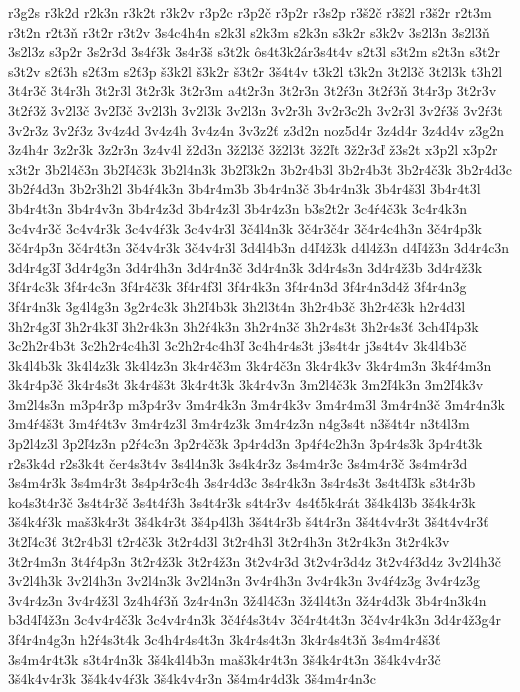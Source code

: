 {r3g2s
r3k2d
r2k3n
r3k2t
r3k2v
r3p2c
r3p2č
r3p2r
r3s2p
r3š2č
r3š2l
r3š2r
r2t3m
r3t2n
r2t3ň
r3t2r
r3t2v
3s4c4h4n
s2k3l
s2k3m
s2k3n
s3k2r
s3k2v
3s2l3n
3s2l3ň
3s2l3z
s3p2r
3s2r3d
3s4ŕ3k
3s4r3š
s3t2k
ôs4t3k2ár3s4t4v
s2t3l
s3t2m
s2t3n
s3t2r
s3t2v
s2ť3h
s2ť3m
s2ť3p
š3k2l
š3k2r
š3t2r
3š4t4v
t3k2l
t3k2n
3t2l3č
3t2l3k
t3h2l
3t4r3č
3t4r3h
3t2r3l
3t2r3k
3t2r3m
a4t2r3n
3t2r3n
3t2ŕ3n
3t2ŕ3ň
3t4r3p
3t2r3v
3t2ŕ3ž
3v2l3č
3v2ľ3č
3v2l3h
3v2l3k
3v2l3n
3v2r3h
3v2r3c2h
3v2r3l
3v2ŕ3š
3v2ŕ3t
3v2r3z
3v2ŕ3z
3v4z4d
3v4z4h
3v4z4n
3v3z2ť
z3d2n
noz5d4r
3z4d4r
3z4d4v
z3g2n
3z4h4r
3z2r3k
3z2r3n
3z4v4l
ž2d3n
3ž2l3č
3ž2l3t
3ž2ľt
3ž2r3ď
ž3s2t
x3p2l
x3p2r
x3t2r
3b2l4č3n
3b2ľ4č3k
3b2l4n3k
3b2ľ3k2n
3b2r4b3l
3b2r4b3t
3b2r4č3k
3b2r4d3c
3b2ŕ4d3n
3b2r3h2l
3b4ŕ4k3n
3b4r4m3b
3b4r4n3č
3b4r4n3k
3b4r4š3l
3b4r4t3l
3b4r4t3n
3b4r4v3n
3b4r4z3d
3b4r4z3l
3b4r4z3n
b3s2t2r
3c4ŕ4č3k
3c4r4k3n
3c4v4r3č
3c4v4r3k
3c4v4ŕ3k
3c4v4r3l
3č4l4n3k
3č4r3č4r
3č4r4c4h3n
3č4r4p3k
3č4r4p3n
3č4r4t3n
3č4v4r3k
3č4v4r3l
3d4l4b3n
d4ľ4ž3k
d4l4ž3n
d4ľ4ž3n
3d4r4c3n
3d4r4g3ľ
3d4r4g3n
3d4r4h3n
3d4r4n3č
3d4r4n3k
3d4r4s3n
3d4r4ž3b
3d4r4ž3k
3f4r4c3k
3f4r4c3n
3f4r4č3k
3f4r4f3l
3f4r4k3n
3f4r4n3d
3f4r4n3d4ž
3f4r4n3g
3f4r4n3k
3g4l4g3n
3g2r4c3k
3h2ľ4b3k
3h2l3t4n
3h2r4b3č
3h2r4č3k
h2r4d3l
3h2r4g3ľ
3h2r4k3ľ
3h2r4k3n
3h2ŕ4k3n
3h2r4n3č
3h2r4s3t
3h2r4s3ť
3ch4ľ4p3k
3c2h2r4b3t
3c2h2r4c4h3l
3c2h2r4c4h3ľ
3c4h4r4s3t
j3s4t4r
j3s4t4v
3k4l4b3č
3k4l4b3k
3k4l4z3k
3k4l4z3n
3k4r4č3m
3k4r4č3n
3k4r4k3v
3k4r4m3n
3k4ŕ4m3n
3k4r4p3č
3k4r4s3t
3k4r4š3t
3k4r4t3k
3k4r4v3n
3m2l4č3k
3m2ľ4k3n
3m2ľ4k3v
3m2l4s3n
m3p4r3p
m3p4r3v
3m4r4k3n
3m4r4k3v
3m4r4m3l
3m4r4n3č
3m4r4n3k
3m4ŕ4š3t
3m4ŕ4t3v
3m4r4z3l
3m4r4z3k
3m4r4z3n
n4g3s4t
n3š4t4r
n3t4l3m
3p2l4z3l
3p2ľ4z3n
p2ŕ4c3n
3p2r4č3k
3p4r4d3n
3p4ŕ4c2h3n
3p4r4s3k
3p4r4t3k
r2s3k4d
r2s3k4t
čer4s3t4v
3s4l4n3k
3s4k4r3z
3s4m4r3c
3s4m4r3č
3s4m4r3d
3s4m4r3k
3s4m4r3t
3s4p4r3c4h
3s4r4d3c
3s4r4k3n
3s4r4s3t
3s4t4ľ3k
s3t4r3b
ko4s3t4r3č
3s4t4r3č
3s4t4ŕ3h
3s4t4r3k
s4t4r3v
4s4ť5k4rát
3š4k4l3b
3š4k4r3k
3š4k4ŕ3k
maš3k4r3t
3š4k4r3t
3š4p4l3h
3š4t4r3b
š4t4r3n
3š4t4v4r3t
3š4t4v4r3ť
3t2ľ4c3ť
3t2r4b3l
t2r4č3k
3t2r4d3l
3t2r4h3l
3t2r4h3n
3t2r4k3n
3t2r4k3v
3t2r4m3n
3t4ŕ4p3n
3t2r4ž3k
3t2r4ž3n
3t2v4r3d
3t2v4r3d4z
3t2v4ŕ3d4z
3v2l4h3č
3v2l4h3k
3v2l4h3n
3v2l4n3k
3v2l4n3n
3v4r4h3n
3v4r4k3n
3v4ŕ4z3g
3v4r4z3g
3v4r4z3n
3v4r4ž3l
3z4h4ŕ3ň
3z4r4n3n
3ž4l4č3n
3ž4l4t3n
3ž4r4d3k
3b4r4n3k4n
b3d4ľ4ž3n
3c4v4r4č3k
3c4v4r4n3k
3č4ŕ4s3t4v
3č4r4t4t3n
3č4v4r4k3n
3d4r4ž3g4r
3f4r4n4g3n
h2ŕ4s3t4k
3c4h4r4s4t3n
3k4r4s4t3n
3k4r4s4t3ň
3s4m4r4š3ť
3s4m4r4t3k
s3t4r4n3k
3š4k4l4b3n
maš3k4r4t3n
3š4k4r4t3n
3š4k4v4r3č
3š4k4v4r3k
3š4k4v4ŕ3k
3š4k4v4r3n
3š4m4r4d3k
3š4m4r4n3c
}
